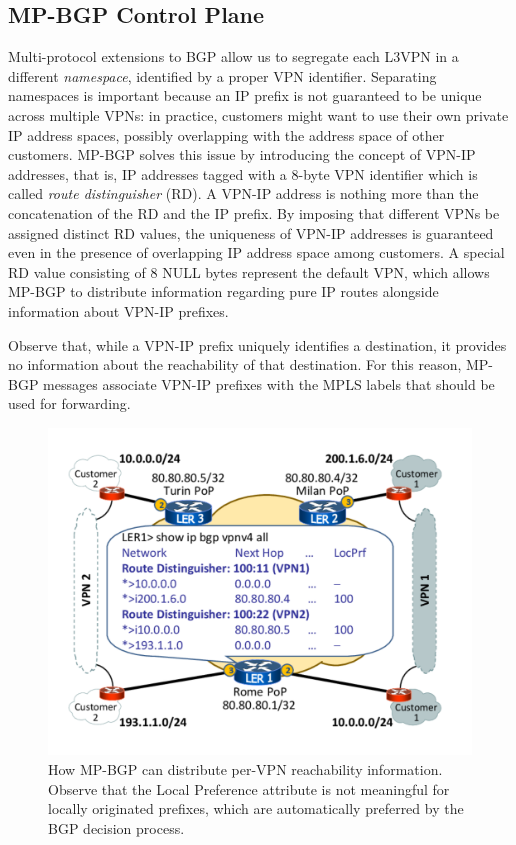 \documentclass{article}
\begin{document}
\subsection{MP-BGP Control Plane}
Multi-protocol extensions to BGP allow us to segregate each L3VPN in a different 
\emph{namespace}, identified by a proper VPN identifier. Separating namespaces 
is important because an IP prefix is not guaranteed to be unique across multiple 
VPNs: in practice, customers might want to use their own private IP address 
spaces, possibly overlapping with the address space of other customers. MP-BGP 
solves this issue by introducing the concept of VPN-IP addresses, that is, IP 
addresses tagged with a 8-byte VPN identifier which is called \emph{route 
distinguisher} (RD). A VPN-IP address is nothing more than the concatenation of 
the RD and the IP prefix. By imposing that different VPNs be assigned distinct 
RD values, the uniqueness of VPN-IP addresses is guaranteed even in the presence 
of overlapping IP address space among customers. A special RD value consisting 
of 8 NULL bytes represent the default VPN, which allows MP-BGP to distribute 
information regarding pure IP routes alongside information about VPN-IP prefixes.

Observe that, while a VPN-IP prefix uniquely identifies a destination, it 
provides no information about the reachability of that destination. For this 
reason, MP-BGP messages associate VPN-IP prefixes with the MPLS labels that 
should be used for forwarding.

\begin{figure}
\centering
 \includegraphics[trim=0cm 1.5cm 0cm 1.5cm, clip=true, width=0.7\columnwidth]{figures/mpls-slides-12}
 \caption{How MP-BGP can distribute per-VPN reachability information. Observe that the Local Preference attribute is not meaningful for locally originated prefixes, which are automatically preferred by the BGP decision process.}
 \label{fig:mpls-slides-12}
\end{figure}
\end{document}
